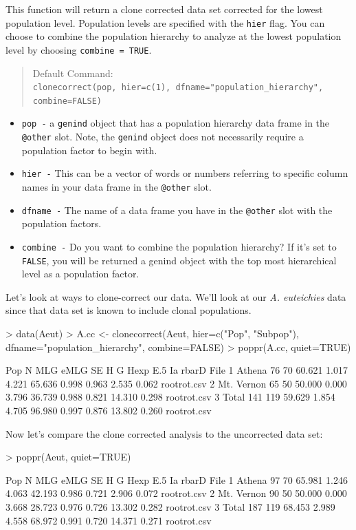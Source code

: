 \documentclass[letterpaper]{article}
\newcommand{\tab}{\hspace*{1em}}
\begin{document}
\tab\tab This function will return a clone corrected data set corrected for the lowest population level. Population levels are specified with the \texttt{hier} flag. You can choose to combine the population hierarchy to analyze at the lowest population level by choosing \texttt{combine = TRUE}.
\begin{quote}
Default Command:\\
\texttt{clonecorrect(pop, hier=c(1), dfname="population\_hierarchy", combine=FALSE)}
\end{quote}
\begin{itemize}
  \item \texttt{pop -} a \texttt{genind} object that has a population hierarchy data frame in the \texttt{@other} slot. Note, the \texttt{genind} object does not necessarily require a population factor to begin with. 
  \item \texttt{hier -} This can be a vector of words or numbers referring to specific column names in your data frame in the \texttt{@other} slot.
  \item \texttt{dfname -} The name of a data frame you have in the \texttt{@other} slot with the population factors.
  \item \texttt{combine -} Do you want to combine the population hierarchy? If it's set to \texttt{FALSE}, you will be returned a genind object with the top most hierarchical level as a population factor. 
\end{itemize}

Let's look at ways to clone-correct our data. We'll look at our \textit{A. euteichies} data since that data set is known to include clonal populations. \cite{Grunwald:2006}
\begin{Schunk}
\begin{Sinput}
> data(Aeut)
> A.cc <- clonecorrect(Aeut,  hier=c("Pop", "Subpop"), dfname="population_hierarchy", combine=FALSE)
> poppr(A.cc, quiet=TRUE)
\end{Sinput}
\begin{Soutput}
         Pop   N MLG   eMLG    SE     H      G  Hexp   E.5     Ia rbarD        File
1     Athena  76  70 60.621 1.017 4.221 65.636 0.998 0.963  2.535 0.062 rootrot.csv
2 Mt. Vernon  65  50 50.000 0.000 3.796 36.739 0.988 0.821 14.310 0.298 rootrot.csv
3      Total 141 119 59.629 1.854 4.705 96.980 0.997 0.876 13.802 0.260 rootrot.csv
\end{Soutput}
\end{Schunk}
Now let's compare the clone corrected analysis to the uncorrected data set:
\begin{Schunk}
\begin{Sinput}
> poppr(Aeut, quiet=TRUE)
\end{Sinput}
\begin{Soutput}
         Pop   N MLG   eMLG    SE     H      G  Hexp   E.5     Ia rbarD        File
1     Athena  97  70 65.981 1.246 4.063 42.193 0.986 0.721  2.906 0.072 rootrot.csv
2 Mt. Vernon  90  50 50.000 0.000 3.668 28.723 0.976 0.726 13.302 0.282 rootrot.csv
3      Total 187 119 68.453 2.989 4.558 68.972 0.991 0.720 14.371 0.271 rootrot.csv
\end{Soutput}
\end{Schunk}
\end{document}
